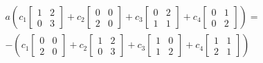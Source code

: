 \documentclass{article}
\begin{document}
\begin{solution}
\begin{multline*}
a
\left(
c_{1}
\begin{bmatrix}
1	&	2	\\
0	&	3
\end{bmatrix}
+c_{2}
\begin{bmatrix}
0	&	0	\\
2	&	0
\end{bmatrix}
+c_{3}
\begin{bmatrix}
0	&	2	\\
1	&	1
\end{bmatrix}
+c_{4}
\begin{bmatrix}
0	&	1	\\
0	&	2
\end{bmatrix}
\right)
=\\
-
\left(
c_{1}
\begin{bmatrix}
0	&	0	\\
2	&	0
\end{bmatrix}
+c_{2}
\begin{bmatrix}
1	&	2	\\
0	&	3
\end{bmatrix}
+c_{3}
\begin{bmatrix}
1	&	0	\\
1	&	2
\end{bmatrix}
+c_{4}
\begin{bmatrix}
1	&	1	\\
2	&	1
\end{bmatrix}
\right)
\end{multline*}


\end{solution}
\end{document}
